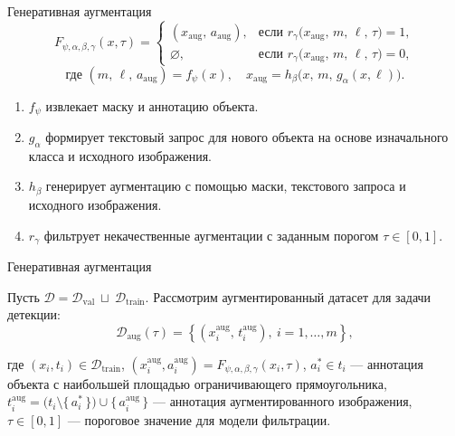 \documentclass{beamer}
\begin{document}
\begin{frame}{Генеративная аугментация}
\[
F_{\psi,\alpha,\beta,\gamma}(x, \tau)
=
\begin{cases}
(x_\mathrm{aug},\,a_\mathrm{aug}), 
& \text{если } r_{\gamma}\bigl(x_\mathrm{aug},\,m,\,\ell,\,\tau\bigr)=1,\\[1em]
\varnothing, 
& \text{если } r_{\gamma}\bigl(x_\mathrm{aug},\,m,\,\ell,\,\tau\bigr)=0,
\end{cases}
\]
\[
\text{где }
(m,\,\ell,\,a_\mathrm{aug}) = f_{\psi}(x),
\quad
x_\mathrm{aug} = h_{\beta}\bigl(x,\,m,\,g_{\alpha}(x,\ell)\bigr).
\]

\vspace{0.5em}
\begin{enumerate}
  \item \(f_{\psi}\) извлекает маску и аннотацию объекта.
  \item \(g_{\alpha}\)  формирует текстовый запрос для нового объекта на основе изначального класса и исходного изображения.
  \item \(h_{\beta}\) генерирует аугментацию с помощью маски, текстового запроса и исходного изображения.
  \item \(r_{\gamma}\) фильтрует некачественные аугментации с заданным порогом \(\tau\in[0,1]\).
\end{enumerate}
\end{frame}


\begin{frame}{Генеративная аугментация}

Пусть $\mathcal{D} = \mathcal{D}_{\text{val}} \ \sqcup \ \mathcal{D}_{\text{train}}$. Рассмотрим аугментированный датасет для задачи детекции:
\[
\mathcal{D}_{\text{aug}}(\tau) =
\left\{
  (x_i^{\text{aug}},\,t_i^{\text{aug}}), \
  i = 1,\dots,m
\right\},
\]

где $(x_i, t_i) \in \mathcal{D}_{\mathrm{train}}$,
$(x_i^{\mathrm{aug}}, a_i^{\mathrm{aug}}) = F_{\psi,\alpha,\beta,\gamma}(x_i, \tau)$,
$a_i^* \in t_i$ — аннотация объекта с наибольшей площадью ограничивающего прямоугольника,
$t_i^{\mathrm{aug}} = \bigl(t_i \setminus \{\,a_i^*\,\}\bigr) \cup \{\,a_i^{\mathrm{aug}}\,\}$ — аннотация аугментированного изображения,
$\tau \in [0,1]$ — пороговое значение для модели фильтрации.

\end{frame}
\end{document}
